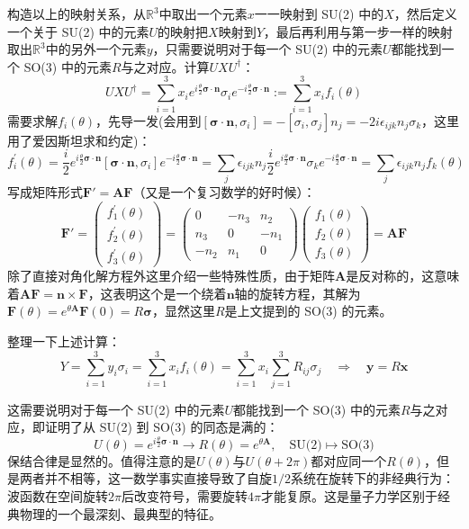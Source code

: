 构造以上的映射关系，从$\mathbb{R}^3$中取出一个元素$x$一一映射到 SU(2) 中的$X$，然后定义一个关于 SU(2) 中的元素$U$的映射把$X$映射到$Y$，最后再利用与第一步一样的映射取出$\mathbb{R}^3$中的另外一个元素$y$，只需要说明对于每一个 SU(2) 中的元素$U$都能找到一个 SO(3) 中的元素$R$与之对应。计算$UXU^\dagger$：
\[UXU^\dagger=\sum_{i=1}^{3}x_ie^{i\frac{\theta}{2}\bm{\sigma}\cdot\bm{n}}\sigma_ie^{-i\frac{\theta}{2}\bm{\sigma}\cdot\bm{n}}:=\sum_{i=1}^{3}x_if_i(\theta)\]
需要求解$f_i(\theta)$，先导一发(会用到$[\bm{\sigma}\cdot\bm{n},\sigma_i]=-[\sigma_i,\sigma_j]n_j=-2i\epsilon_{ijk}n_j\sigma_k$，这里用了爱因斯坦求和约定)：
\[f_i^{\prime}(\theta)=\frac{i}{2}e^{i\frac{\theta}{2}\bm{\sigma}\cdot\bm{n}}[\bm{\sigma}\cdot\bm{n},\sigma_i]e^{-i\frac{\theta}{2}\bm{\sigma}\cdot\bm{n}}=\sum_{j}\epsilon_{ijk}n_j\frac{i}{2}e^{i\frac{\theta}{2}\bm{\sigma}\cdot\bm{n}}\sigma_ke^{-i\frac{\theta}{2}\bm{\sigma}\cdot\bm{n}}=\sum_{j}\epsilon_{ijk}n_jf_k(\theta)\]
写成矩阵形式$\mathbf{F}'=\mathbf{A}\mathbf{F}$（又是一个复习数学的好时候）：
\[\mathbf{F}'=\begin{pmatrix}f_1^{\prime}(\theta)\\f_2^{\prime}(\theta)\\f_3^{\prime}(\theta)\end{pmatrix}=\begin{pmatrix}0&-n_3&n_2\\n_3&0&-n_1\\-n_2&n_1&0\end{pmatrix}\begin{pmatrix}f_1(\theta)\\f_2(\theta)\\f_3(\theta)\end{pmatrix}=\mathbf{A}\mathbf{F}\]
除了直接对角化解方程外这里介绍一些特殊性质，由于矩阵$\mathbf{A}$是反对称的，这意味着$\mathbf{A}\mathbf{F}=\mathbf{n}\times\mathbf{F}$，这表明这个是一个绕着$\mathbf{n}$轴的旋转方程，其解为$\mathbf{F}(\theta)=e^{\theta\mathbf{A}}\mathbf{F}(0)=R\bm{\sigma}$，显然这里$R$是上文提到的 SO(3) 的元素。

整理一下上述计算：
\[Y=\sum_{i=1}^3y_i\sigma_i=\sum_{i=1}^{3}x_if_i(\theta)=\sum_{i=1}^{3}x_i\sum_{j=1}^{3}R_{ij}\sigma_j \quad \Rightarrow \quad \mathbf{y}=R\mathbf{x}\]

这需要说明对于每一个 SU(2) 中的元素$U$都能找到一个 SO(3) 中的元素$R$与之对应，即证明了从 SU(2) 到 SO(3) 的同态是满的：
\[U(\theta)=e^{i\frac{\theta}{2}\bm{\sigma}\cdot\bm{n}} \to R(\theta)=e^{\theta\mathbf{A}}, \quad \text{SU(2)} \mapsto \text{SO(3)}\]
保结合律是显然的。值得注意的是$U(\theta)$与$U(\theta+2\pi)$都对应同一个$R(\theta)$，但是两者并不相等，这一数学事实直接导致了自旋$1/2$系统在旋转下的非经典行为：波函数在空间旋转$2\pi$后改变符号，需要旋转$4\pi$才能复原。这是量子力学区别于经典物理的一个最深刻、最典型的特征。


